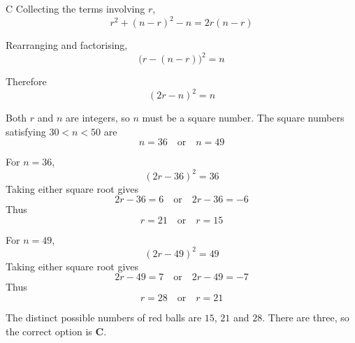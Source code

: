 \documentclass[11pt,a4paper]{article}
\begin{document}
\begin{enumerate}[label=\textbf{\arabic*.},leftmargin=*,itemsep=0pt,start=13]
\begin{djsSolution}{C}
Collecting the terms involving $r$,
\[
r^2+(n-r)^2-n=2r(n-r)
\]

Rearranging and factorising,
\[
\bigl(r-(n-r)\bigr)^2=n
\]

Therefore
\[
(2r-n)^2=n
\]

Both $r$ and $n$ are integers, so $n$ must be a square number. The square numbers satisfying $30<n<50$ are
\[
n=36\quad\text{or}\quad n=49
\]

For $n=36$,
\[
(2r-36)^2=36
\]
Taking either square root gives
\[
2r-36=6\quad\text{or}\quad 2r-36=-6
\]
Thus
\[
r=21\quad\text{or}\quad r=15
\]

For $n=49$,
\[
(2r-49)^2=49
\]
Taking either square root gives
\[
2r-49=7\quad\text{or}\quad 2r-49=-7
\]
Thus
\[
r=28\quad\text{or}\quad r=21
\]

The distinct possible numbers of red balls are $15$, $21$ and $28$. There are three, so the correct option is \textbf{C}.
\end{djsSolution}
\end{enumerate}
\clearpage
\thispagestyle{djssolutions}
\vspace*{8pt}
\end{document}
